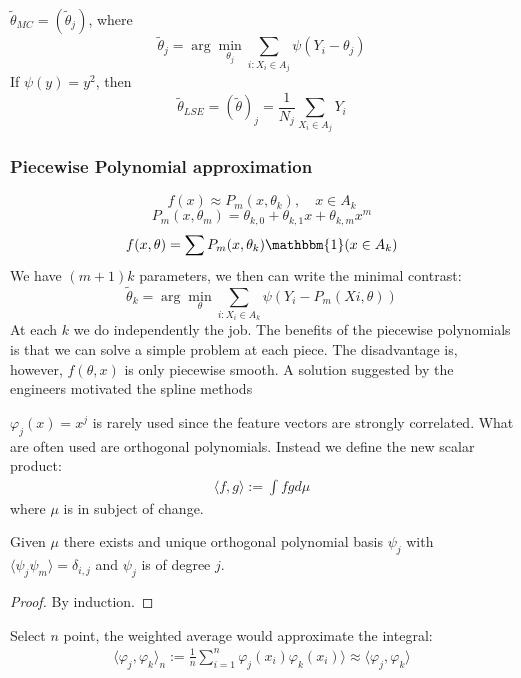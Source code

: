 \begin{theorem}
	$\tilde{\theta}_{MC} = (\tilde{\theta}_j)$, where
	\begin{equation*}
		\tilde{\theta}_j = \arg \min_{\theta_j} \sum_{i: X_i \in A_j} \psi(Y_i - \theta_j)
	\end{equation*}
	If $\psi(y) = y^2$, then
	\begin{equation*}
		\tilde{\theta}_{LSE} = (\tilde{\theta})_j = \frac{1}{N_j} \sum_{X_i \in A_j} Y_i
	\end{equation*} 
\end{theorem}

\subsubsection*{Piecewise Polynomial approximation}
\begin{equation*}
	f(x) \approx P_m (x, \theta_k), \quad x \in A_k
\end{equation*}
\begin{equation*}
	P_m(x, \theta_m) = \theta_{k,0} + \theta_{k,1}x + \theta_{k,m} x^m
\end{equation*}
\begin{equation*}
	f(x, \theta) = \sum P_m(x, \theta_k) \mathbbm{1}(x \in A_k)
\end{equation*}
We have $(m+1)k$ parameters, we then can write the minimal contrast:
\begin{equation*}
	\tilde{\theta}_k = \arg \min_\theta \sum_{i: X_i \in A_k} \psi(Y_i - P_m(Xi, \theta))
\end{equation*}
At each $k$ we do independently the job. The benefits of the piecewise polynomials is that we can solve a simple problem at each piece. The disadvantage is, however, $f(\theta, x)$ is only piecewise smooth. A solution suggested by the engineers motivated the spline methods

$\varphi_j (x) = x^j$ is rarely used since the feature vectors are strongly correlated. What are often used are orthogonal polynomials. Instead we define the new scalar product:
\begin{align*}
	\langle f, g \rangle := \int f g d\mu 
\end{align*}
where $\mu$ is in subject of change. 

\begin{theorem}
	Given $\mu$ there exists and unique orthogonal polynomial basis $\psi_j$ with $\langle \psi_j \psi_m \rangle = \delta_{i, j}$ and $\psi_j$ is of degree $j$.
\end{theorem}
\begin{proof}
	 By induction.
\end{proof}
Select $n$ point, the weighted average would approximate the integral:
\begin{align*}
	\langle \varphi_j, \varphi_k \rangle_n:= \frac{1}{n}\sum_{i = 1}^n \varphi_j(x_i) \varphi_k(x_i)\rangle \approx \langle \varphi_j , \varphi_k \rangle
\end{align*}




